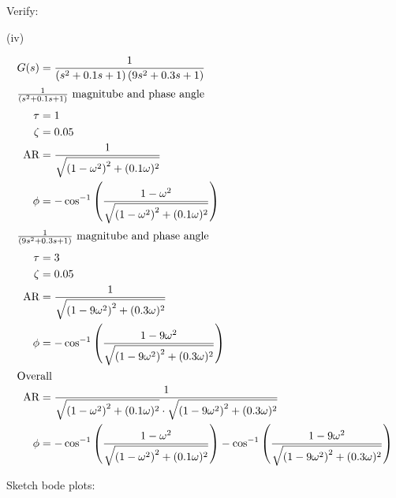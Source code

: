 \documentclass[12pt]{article}
\begin{document}
\begin{enumerate}
    Verify:

    \begin{center}
        
    \end{center}

    (iv)

    \begin{align*}
        G(s) &= \frac{1}{\left(s^2+0.1s+1\right)\left(9s^2+0.3s+1\right)} \\
        \intertext{$\frac{1}{\left(s^2+0.1s+1\right)}$ magnitube and phase angle}
        \tau &= 1 \\
        \zeta &= 0.05 \\
        \text{AR} &= \frac{1}{\sqrt{\left(1-\omega^2\right)^2+(0.1\omega)^2}} \\
        \phi &= -\cos^{-1}\left(\frac{1-\omega^2}{\sqrt{\left(1-\omega^2\right)^2+(0.1\omega)^2}}\right) \\
        \intertext{$\frac{1}{\left(9s^2+0.3s+1\right)}$ magnitube and phase angle}
        \tau &= 3 \\
        \zeta &= 0.05 \\
        \text{AR} &= \frac{1}{\sqrt{\left(1-9\omega^2\right)^2+(0.3\omega)^2}} \\
        \phi &= -\cos^{-1}\left(\frac{1-9\omega^2}{\sqrt{\left(1-9\omega^2\right)^2+(0.3\omega)^2}}\right) \\
        \intertext{Overall}
        \text{AR} &= \frac{1}{\sqrt{\left(1-\omega^2\right)^2+(0.1\omega)^2} \cdot \sqrt{\left(1-9\omega^2\right)^2+(0.3\omega)^2}} \\
        \phi &= -\cos^{-1}\left(\frac{1-\omega^2}{\sqrt{\left(1-\omega^2\right)^2+(0.1\omega)^2}}\right) - \cos^{-1}\left(\frac{1-9\omega^2}{\sqrt{\left(1-9\omega^2\right)^2+(0.3\omega)^2}}\right) \\
    \end{align*}

    Sketch bode plots:


\end{enumerate}
\end{document}
